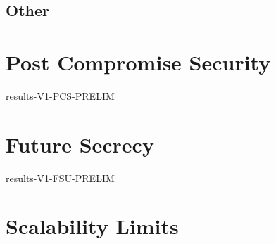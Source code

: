 \hypertarget{other}{%
\subsection{Other}\label{other}}


\hypertarget{post-compromise-security}{%
\section{Post Compromise Security}\label{post-compromise-security}}

{results-V1-PCS-PRELIM}


\hypertarget{future-secrecy}{%
\section{Future Secrecy}\label{future-secrecy}}

{results-V1-FSU-PRELIM}


\hypertarget{scalability-limits}{%
\section*{Scalability Limits}\label{scalability-limits}}
